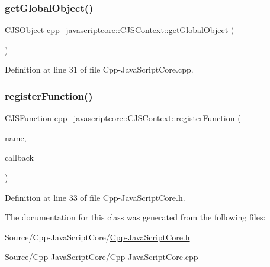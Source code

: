 \subsubsection{\texorpdfstring{get\+Global\+Object()}{getGlobalObject()}}
{\footnotesize\ttfamily \mbox{\hyperlink{classcpp__javascriptcore_1_1_c_j_s_object}{C\+J\+S\+Object}} cpp\+\_\+javascriptcore\+::\+C\+J\+S\+Context\+::get\+Global\+Object (\begin{DoxyParamCaption}{ }\end{DoxyParamCaption})}



Definition at line 31 of file Cpp-\/\+Java\+Script\+Core.\+cpp.

\mbox{\label{classcpp__javascriptcore_1_1_c_j_s_context_a8136d96922f8403ed268df9867af761c}} 
\subsubsection{\texorpdfstring{register\+Function()}{registerFunction()}}
{\footnotesize\ttfamily \mbox{\hyperlink{classcpp__javascriptcore_1_1_c_j_s_function}{C\+J\+S\+Function}} cpp\+\_\+javascriptcore\+::\+C\+J\+S\+Context\+::register\+Function (\begin{DoxyParamCaption}\item[{std\+::string}]{name,  }\item[{\mbox{\hyperlink{classcpp__javascriptcore_1_1_c_j_s_function_a3cf83c4e33bfeafbe770047bb75556f5}{C\+J\+S\+Function\+::\+Callback}}}]{callback }\end{DoxyParamCaption})\hspace{0.3cm}{\ttfamily [inline]}}



Definition at line 33 of file Cpp-\/\+Java\+Script\+Core.\+h.



The documentation for this class was generated from the following files\+:\begin{DoxyCompactItemize}
\item 
Source/\+Cpp-\/\+Java\+Script\+Core/\mbox{\hyperlink{_cpp-_java_script_core_8h}{Cpp-\/\+Java\+Script\+Core.\+h}}\item 
Source/\+Cpp-\/\+Java\+Script\+Core/\mbox{\hyperlink{_cpp-_java_script_core_8cpp}{Cpp-\/\+Java\+Script\+Core.\+cpp}}\end{DoxyCompactItemize}
